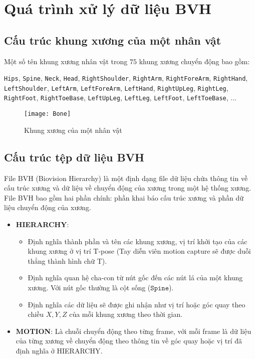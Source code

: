 \chapter{Quá trình xử lý dữ liệu BVH}
\label{appendix:BVHData}

\section{Cấu trúc khung xương của một nhân vật}
\label{appendix:BVHData:skeleton}

Một số tên khung xương nhân vật trong $75$ khung xương chuyển động bao gồm:

{
\small
\texttt{Hips},
\texttt{Spine},
\texttt{Neck},
\texttt{Head},
\texttt{RightShoulder},
\texttt{RightArm},
\texttt{RightForeArm},
\texttt{RightHand},
\texttt{LeftShoulder},
\texttt{LeftArm},
\texttt{LeftForeArm},
\texttt{LeftHand},
\texttt{RightUpLeg},
\texttt{RightLeg},
\texttt{RightFoot},
\texttt{RightToeBase},
\texttt{LeftUpLeg},
\texttt{LeftLeg},
\texttt{LeftFoot},
\texttt{LeftToeBase},
...
}



\begin{figure}[H]
\centering
\texttt{[image: Bone]}
\caption{Khung xương của một nhân vật}
\label{fig:Bone}
\end{figure}

\section{Cấu trúc tệp dữ liệu BVH}
\label{appendix:BVHData:BVHStructure}

File BVH (Biovision Hierarchy) là một định dạng file dữ liệu chứa thông tin về cấu trúc xương và dữ liệu về chuyển động của xương trong một hệ thống xương. File BVH bao gồm hai phần chính: phần khai báo cấu trúc xương và phần dữ liệu chuyển động của xương. 

\begin{itemize}
	\item \textbf{HIERARCHY}:
	
	\begin{itemize}
		\item Định nghĩa thành phần và tên các khung xương, vị trí khởi tạo của các khung xương ở vị trí T-pose (Tay diễn viên motion capture sẽ được duỗi thẳng thành hình chữ T).
		\item Định nghĩa quan hệ cha-con từ nút gốc đến các nút lá của một khung xương. Với nút gốc thường là cột sống ($\texttt{Spine}$).
		\item Định nghĩa các dữ liệu sẽ được ghi nhận như vị trí hoặc góc quay theo chiều $X, Y, Z$ của mỗi khung xương theo thời gian.
	\end{itemize}
	
	\item \textbf{MOTION}: Là chuỗi chuyển động theo từng frame, với mỗi frame là dữ liệu của từng xương về chuyển động theo thông tin về góc quay hoặc vị trí đã định nghĩa ở HIERARCHY.
\end{itemize}

